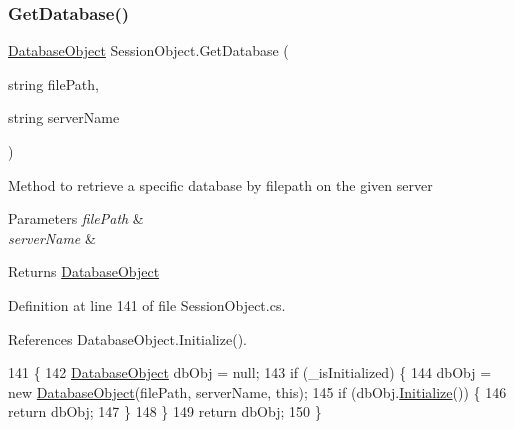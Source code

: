 \subsubsection{\texorpdfstring{Get\+Database()}{GetDatabase()}}
{\footnotesize\ttfamily \mbox{\hyperlink{class_database_object}{Database\+Object}} Session\+Object.\+Get\+Database (\begin{DoxyParamCaption}\item[{string}]{file\+Path,  }\item[{string}]{server\+Name }\end{DoxyParamCaption})}



Method to retrieve a specific database by filepath on the given server 


\begin{DoxyParams}{Parameters}
{\em file\+Path} & \\
\hline
{\em server\+Name} & \\
\hline
\end{DoxyParams}
\begin{DoxyReturn}{Returns}
\mbox{\hyperlink{class_database_object}{Database\+Object}}
\end{DoxyReturn}


Definition at line 141 of file Session\+Object.\+cs.



References Database\+Object.\+Initialize().


\begin{DoxyCode}
141                                                                           \{
142         \mbox{\hyperlink{class_database_object}{DatabaseObject}} dbObj = null;
143         \textcolor{keywordflow}{if} (\_isInitialized) \{
144             dbObj = \textcolor{keyword}{new} \mbox{\hyperlink{class_database_object}{DatabaseObject}}(filePath, serverName, \textcolor{keyword}{this});
145             \textcolor{keywordflow}{if} (dbObj.\mbox{\hyperlink{class_database_object_a7de43a21bd287deec537cffec343f41d}{Initialize}}()) \{
146                 \textcolor{keywordflow}{return} dbObj;
147             \}
148         \}
149         \textcolor{keywordflow}{return} dbObj;
150     \}
\end{DoxyCode}
\mbox{\label{class_session_object_ae53bad1d2fe161060ae409024b3e0de4}} 
